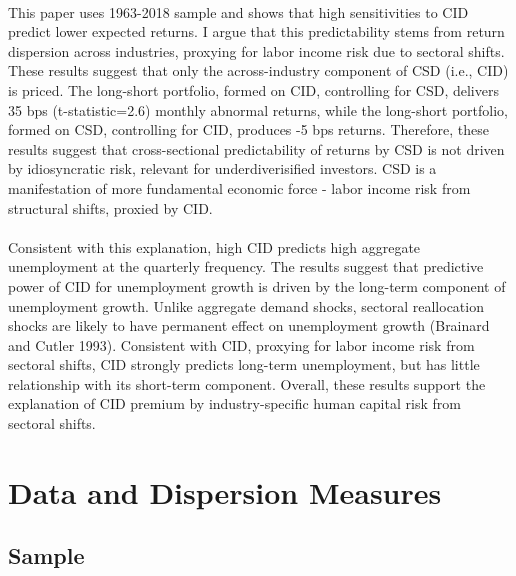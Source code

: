 \documentclass[12pt]{article}
\begin{document}
\paragraph{}
This paper uses 1963-2018 sample and shows that high sensitivities to CID predict lower expected returns. I argue that this predictability stems from return dispersion across industries, proxying for labor income risk due to sectoral shifts. These results suggest that only the across-industry component of CSD (i.e., CID) is priced. The long-short portfolio, formed on CID, controlling for CSD, delivers 35 bps (t-statistic=2.6) monthly abnormal returns, while the long-short portfolio, formed on CSD, controlling for CID, produces -5 bps returns. Therefore, these results suggest that cross-sectional predictability of returns by CSD is not driven by idiosyncratic risk, relevant for underdiverisified investors. CSD is a manifestation of more fundamental economic force - labor income risk from structural shifts, proxied by CID. 
\paragraph{}
Consistent with this explanation, high CID predicts high aggregate unemployment at the quarterly frequency. The results suggest that predictive power of CID for unemployment growth is driven by the long-term component of unemployment growth. Unlike aggregate demand shocks, sectoral reallocation shocks are likely to have permanent effect on unemployment growth (Brainard and Cutler 1993). Consistent with CID, proxying for labor income risk from sectoral shifts, CID strongly predicts long-term unemployment, but has little relationship with its short-term component.  Overall, these results support the explanation of CID premium by industry-specific human capital risk from sectoral shifts.



\section{Data and Dispersion Measures} \label{sec:Model}

\subsection{Sample}
\end{document}
